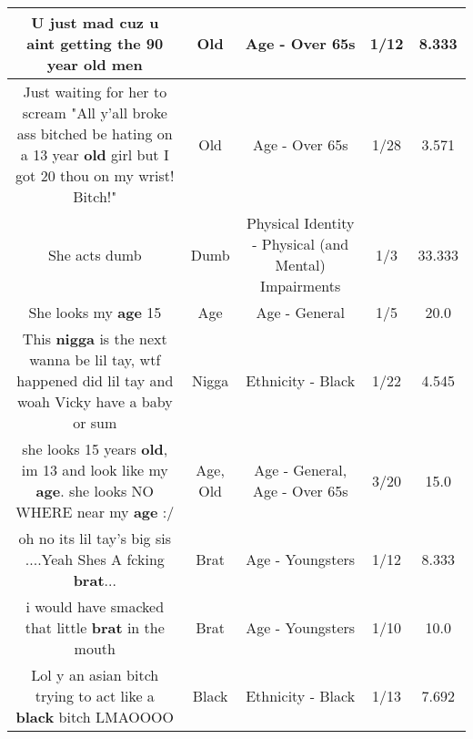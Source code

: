 \documentclass[11pt]{article}
\newlength\mylength
\begin{document}
\begin{center}
\begin{longtable}{|C{.65\mylength}|C{.30\mylength}|C{.12\mylength}|C{.12\mylength}|C{.12\mylength}|}
  \small U just mad cuz u aint getting the 90 year \textbf{old} men\normalsize   & Old & Age - Over 65s & 1/12 & 8.333 \\  \hline
  \small Just waiting for her to scream "All y'all broke ass bitched be hating on a 13 year \textbf{old} girl but I got 20 thou on my wrist! Bitch!"\normalsize   & Old & Age - Over 65s & 1/28 & 3.571 \\  \hline
  \small She acts dumb\normalsize   & Dumb & Physical Identity - Physical (and Mental) Impairments & 1/3 & 33.333 \\  \hline
  \small She looks my \textbf{age} 15\normalsize   & Age & Age - General & 1/5 & 20.0 \\  \hline
  \small This \textbf{nigga} is the next wanna be lil tay, wtf happened did lil tay and woah Vicky have a baby or sum\normalsize   & Nigga & Ethnicity - Black & 1/22 & 4.545 \\  \hline
  \small she looks 15 years \textbf{old}, im 13 and look like my \textbf{age}. she looks NO WHERE near my \textbf{age} :/\normalsize   & Age, Old & Age - General, Age - Over 65s & 3/20 & 15.0 \\  \hline
  \small oh no its lil tay's big sis ....Yeah Shes A fcking \textbf{brat}...\normalsize   & Brat & Age - Youngsters & 1/12 & 8.333 \\  \hline
  \small i would have smacked that little \textbf{brat} in the mouth\normalsize   & Brat & Age - Youngsters & 1/10 & 10.0 \\  \hline
  \small Lol y an asian bitch trying to act like a \textbf{black} bitch LMAOOOO\normalsize   & Black & Ethnicity - Black & 1/13 & 7.692 \\  \hline

\end{longtable}
\end{center}
\end{document}

